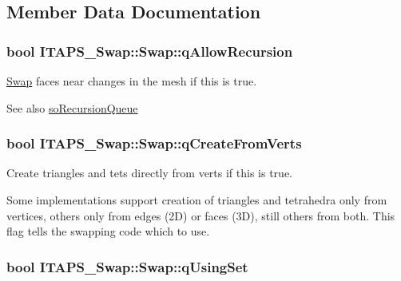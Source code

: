 \subsection{Member Data Documentation}
\hypertarget{class_i_t_a_p_s___swap_1_1_swap_a400dea547bf0c4984d630e2b044a1316}{
\subsubsection[{qAllowRecursion}]{\setlength{\rightskip}{0pt plus 5cm}bool {\bf ITAPS\_\-Swap::Swap::qAllowRecursion}}}
\label{class_i_t_a_p_s___swap_1_1_swap_a400dea547bf0c4984d630e2b044a1316}


\hyperlink{class_i_t_a_p_s___swap_1_1_swap}{Swap} faces near changes in the mesh if this is true. 

\begin{DoxySeeAlso}{See also}
\hyperlink{class_i_t_a_p_s___swap_1_1_swap_ab49c1d524e26177afb0c0f76181304d7}{soRecursionQueue} 
\end{DoxySeeAlso}
\hypertarget{class_i_t_a_p_s___swap_1_1_swap_a37fb33f35799bd3750b2f8fcf32fe81a}{
\subsubsection[{qCreateFromVerts}]{\setlength{\rightskip}{0pt plus 5cm}bool {\bf ITAPS\_\-Swap::Swap::qCreateFromVerts}}}
\label{class_i_t_a_p_s___swap_1_1_swap_a37fb33f35799bd3750b2f8fcf32fe81a}


Create triangles and tets directly from verts if this is true. 

Some implementations support creation of triangles and tetrahedra only from vertices, others only from edges (2D) or faces (3D), still others from both. This flag tells the swapping code which to use. \hypertarget{class_i_t_a_p_s___swap_1_1_swap_ab6c9bfbc58fd9272e3706fa3ce4392c6}{
\subsubsection[{qUsingSet}]{\setlength{\rightskip}{0pt plus 5cm}bool {\bf ITAPS\_\-Swap::Swap::qUsingSet}}}
\label{class_i_t_a_p_s___swap_1_1_swap_ab6c9bfbc58fd9272e3706fa3ce4392c6}


